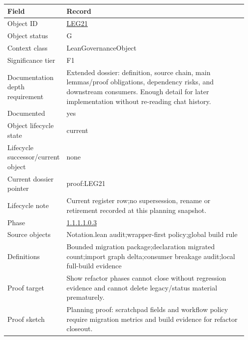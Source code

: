 \begin{longtable}{L{0.16\linewidth} L{0.81\linewidth}}
\hline
\textbf{Field} & \textbf{Record}\\
\hline
Object ID & \hyperlink{object-row-LEG21}{LEG21}\\
\hline\addlinespace[0.20em]
Object status & G\\
\hline\addlinespace[0.20em]
Context class & LeanGovernanceObject\\
\hline\addlinespace[0.20em]
Significance tier & F1\\
\hline\addlinespace[0.20em]
Documentation depth requirement & Extended dossier: definition, source chain, main lemmas/\allowbreak{}proof obligations, dependency risks, and downstream consumers. Enough detail for later implementation without re-reading chat history.\\
\hline\addlinespace[0.20em]
Documented & yes\\
\hline\addlinespace[0.20em]
Object lifecycle state & current\\
\hline\addlinespace[0.20em]
Lifecycle successor/\allowbreak{}current object & none\\
\hline\addlinespace[0.20em]
Current dossier pointer & proof:LEG21\\
\hline\addlinespace[0.20em]
Lifecycle note & Current register row;\newline no supersession, rename or retirement recorded at this planning snapshot.\\
\hline\addlinespace[0.20em]
Phase & \hyperlink{phase-row-1-1-1-1-0-3}{1.1.1.1.0.3}\\
\hline\addlinespace[0.20em]
Source objects & Notation.lean audit;\newline wrapper-first policy;\newline global build rule\\
\hline\addlinespace[0.20em]
Definitions & Bounded migration package;\newline declaration migrated count;\newline import graph delta;\newline consumer breakage audit;\newline local full-build evidence\\
\hline\addlinespace[0.20em]
Proof target & Show refactor phases cannot close without regression evidence and cannot delete legacy/\allowbreak{}status material prematurely.\\
\hline\addlinespace[0.20em]
Proof sketch & Planning proof: scratchpad fields and workflow policy require migration metrics and build evidence for refactor closeout.\\

\end{longtable}
